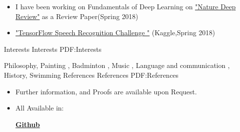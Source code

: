 \documentclass[letterpaper,MMMyyyy,nonstopmode]{simpleresumecv}
\begin{document}
\begin{Body}
\begin{itemize}
        
        \item  I have been working on Fundamentals of Deep Learning on \href{       https://www.cs.toronto.edu/~hinton/absps/NatureDeepReview.pdf}
		{"Nature Deep Review"} as a Review Paper(Spring 2018)
 
       	
       	\item 
      \href{https://www.kaggle.com/c/tensorflow-speech-recognition-challenge}{"TensorFlow Speech Recognition Challenge "} (Kaggle,Spring 2018)
\end{itemize}



\Section
{Interests}
{Interests}
{PDF:Interests}

\Entry
Philosophy,
Painting ,
Badminton ,
Music ,  
Language  and communication ,
History,
Swimming
\Section
{References}
{References}
{PDF:References}

\Entry
\begin{itemize}
\item
Further information, and Proofs are available upon Request.
\item
All Available in:

\href{https://github.com/Yasaman1997} {\textbf{Github}}  




\end{itemize}









\end{Body}

\end{document}
